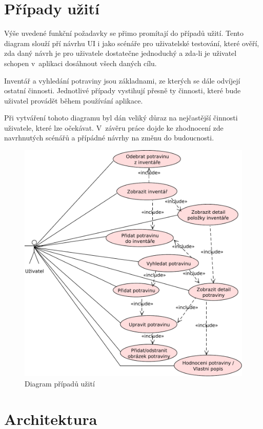 \documentclass[thesis=B,czech]{FITthesis}[2013/10/20]
\begin{document}
\section{Případy užití}

Výše uvedené funkční požadavky se přimo promítají do případů užití. Tento diagram slouží pří návrhu UI i jako scénáře pro uživatelské testování, které ověří, zda daný návrh je pro uživatele dostatečne jednoduchý a zda-li je uživatel schopen v~aplikaci dosáhnout všech daných cílu.

Inventář a vyhledání potraviny jsou základnami, ze kterých se dále odvíjejí ostatní činnosti. Jednotlivé případy vystihují přesně ty činnosti, které bude uživatel provádět během používání aplikace.

Při vytváření tohoto diagramu byl dán veliký důraz na nejčastější činnosti uživatele, které lze očekávat. V~závěru práce dojde ke zhodnocení zde navrhnutých scénářů a přípádné návrhy na změnu do budoucnosti.

\begin{figure}[H]
  \centering
  \includegraphics[scale=0.75]{diagrams/use_case}
  \caption{Diagram případů užití}
  \label{fig:UseCase}
\end{figure}

\section{Architektura}
\end{document}

